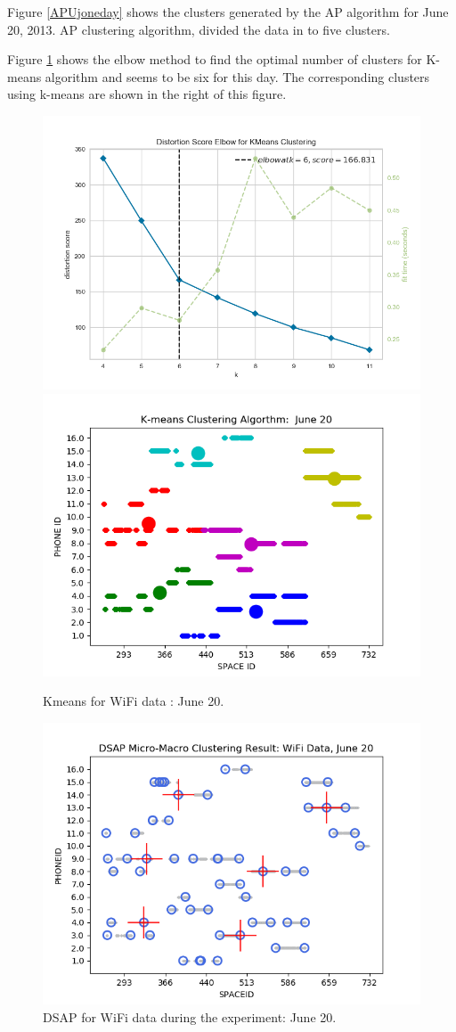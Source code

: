 Figure \ref{APUjoneday} shows the clusters generated by the AP algorithm for June 20, 2013. AP clustering algorithm, divided the data in to five clusters.


Figure \ref{elbowkwifi} shows the elbow method to find the optimal number of clusters for K-means algorithm and seems to be six for this day. The corresponding clusters using k-means are shown in the right of this figure. %


\begin{figure}[!h]
    \centering
    \includegraphics[width = 7.5 cm]{image/Chapters/Chapter6/elbowDay20.png}\hfill
     \includegraphics[width = 7.5 cm]{image/Chapters/Chapter6/kmeansJun20.png}
    \\[\smallskipamount]    
    \caption{Kmeans for WiFi data : June 20.}
    \label{elbowkwifi}
\end{figure}







\begin{figure}[!h]
    \centering
    \includegraphics[width = 10 cm]{image/Chapters/Chapter6/DSAPJune20.png}
    \caption{ DSAP for WiFi data during the experiment: June 20.}
    \label{3}
\end{figure}






